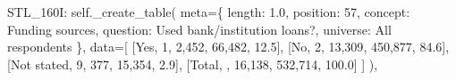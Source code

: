 \documentclass[
  11pt,
  a4paper,
]{article}
\newenvironment{Shaded}{\begin{snugshade}}{\end{snugshade}}
\newcommand{\NormalTok}[1]{\textcolor[rgb]{0.00,0.23,0.31}{#1}}
\newcommand{\OperatorTok}[1]{\textcolor[rgb]{0.37,0.37,0.37}{#1}}
\newcommand{\StringTok}[1]{\textcolor[rgb]{0.13,0.47,0.30}{#1}}
\newcommand{\VariableTok}[1]{\textcolor[rgb]{0.07,0.07,0.07}{#1}}
\begin{document}
\begin{Shaded}
\begin{Highlighting}[]
            \StringTok{\textquotesingle{}STL\_160I\textquotesingle{}}\NormalTok{: }\VariableTok{self}\NormalTok{.\_create\_table(}
\NormalTok{                meta}\OperatorTok{=}\NormalTok{\{}
                    \StringTok{\textquotesingle{}length\textquotesingle{}}\NormalTok{: }\StringTok{\textquotesingle{}1.0\textquotesingle{}}\NormalTok{, }\StringTok{\textquotesingle{}position\textquotesingle{}}\NormalTok{: }\StringTok{\textquotesingle{}57\textquotesingle{}}\NormalTok{,}
                    \StringTok{\textquotesingle{}concept\textquotesingle{}}\NormalTok{: }\StringTok{\textquotesingle{}Funding sources\textquotesingle{}}\NormalTok{,}
                    \StringTok{\textquotesingle{}question\textquotesingle{}}\NormalTok{: }\StringTok{\textquotesingle{}Used bank/institution loans?\textquotesingle{}}\NormalTok{,}
                    \StringTok{\textquotesingle{}universe\textquotesingle{}}\NormalTok{: }\StringTok{\textquotesingle{}All respondents\textquotesingle{}}
\NormalTok{                \},}
\NormalTok{                data}\OperatorTok{=}\NormalTok{[}
\NormalTok{                    [}\StringTok{\textquotesingle{}Yes\textquotesingle{}}\NormalTok{, }\StringTok{\textquotesingle{}1\textquotesingle{}}\NormalTok{, }\StringTok{\textquotesingle{}2,452\textquotesingle{}}\NormalTok{, }\StringTok{\textquotesingle{}66,482\textquotesingle{}}\NormalTok{, }\StringTok{\textquotesingle{}12.5\textquotesingle{}}\NormalTok{],}
\NormalTok{                    [}\StringTok{\textquotesingle{}No\textquotesingle{}}\NormalTok{, }\StringTok{\textquotesingle{}2\textquotesingle{}}\NormalTok{, }\StringTok{\textquotesingle{}13,309\textquotesingle{}}\NormalTok{, }\StringTok{\textquotesingle{}450,877\textquotesingle{}}\NormalTok{, }\StringTok{\textquotesingle{}84.6\textquotesingle{}}\NormalTok{],}
\NormalTok{                    [}\StringTok{\textquotesingle{}Not stated\textquotesingle{}}\NormalTok{, }\StringTok{\textquotesingle{}9\textquotesingle{}}\NormalTok{, }\StringTok{\textquotesingle{}377\textquotesingle{}}\NormalTok{, }\StringTok{\textquotesingle{}15,354\textquotesingle{}}\NormalTok{, }\StringTok{\textquotesingle{}2.9\textquotesingle{}}\NormalTok{],}
\NormalTok{                    [}\StringTok{\textquotesingle{}Total\textquotesingle{}}\NormalTok{, }\StringTok{\textquotesingle{}\textquotesingle{}}\NormalTok{, }\StringTok{\textquotesingle{}16,138\textquotesingle{}}\NormalTok{, }\StringTok{\textquotesingle{}532,714\textquotesingle{}}\NormalTok{, }\StringTok{\textquotesingle{}100.0\textquotesingle{}}\NormalTok{]}
\NormalTok{                ]}
\NormalTok{            ),}
            

\end{Highlighting}
\end{Shaded}
\end{document}
